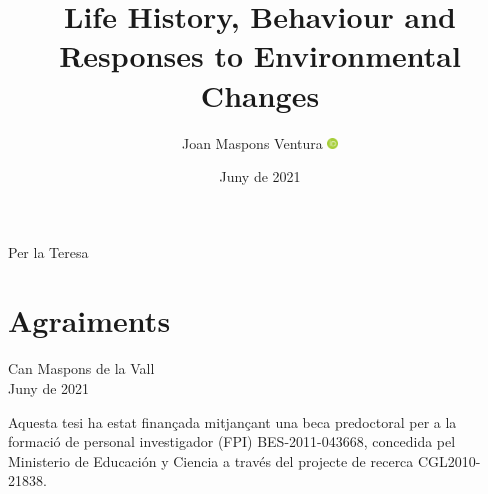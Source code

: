 \documentclass[12pt,a4paper,twoside,fleqn]{memoir}
\title{Life History, Behaviour and Responses to Environmental Changes} %
\author{Joan Maspons Ventura %
  \href{https://orcid.org/0000-0003-2286-8727}{\includegraphics[width=8pt,keepaspectratio=true]{./Figures/intro/orcid_logo.png}}
}
\date{Juny de 2021} %
\begin{document}
\begin{titlingpage}
\maketitle %
\end{titlingpage}

\frontmatter %



\vspace*{.4\textheight}

\begin{flushright}
Per la Teresa
\end{flushright}


\cleardoublepage

\section*{Agraiments}


\hfill

\begin{flushright}
Can Maspons de la Vall\\
Juny de 2021
\end{flushright}

\vspace*{\fill}
\hrulefill

Aquesta tesi ha estat finançada mitjançant una beca predoctoral per a la
formació de personal investigador (FPI) BES-2011-043668, concedida pel
Ministerio de Educación y Ciencia a través del projecte de recerca
CGL2010-21838.

\cleardoublepage %



\end{document}
